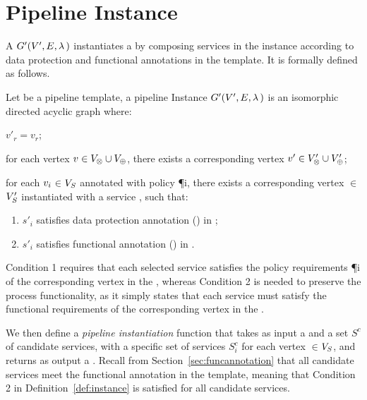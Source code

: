 \section{Pipeline Instance}\label{sec:instance}
A \pipelineInstance $G'(V',E,\lambda\,)$ instantiates a \pipelineTemplate \tChartFunction by composing services in the instance according to data protection and functional annotations in the template.  It is formally defined as follows.

\begin{definition}\label{def:instance}
  Let \tChartFunction be a pipeline template, a pipeline Instance $G'(V',E,\lambda\,)$ is an isomorphic directed acyclic graph where:
  \begin{enumerate*}[label=\textit{\roman*})]
    \item $v'_r$$=$$v_r$;
    \item for each vertex $v_{}\in V_{\otimes}\cup V_{\oplus}$, there exists a corresponding vertex $v'_{}\in V'_{\otimes}\cup V'_{\oplus}$;
    \item for each $v_{i}$$\in$$V_S$ annotated with policy \P{i}, there exists a corresponding vertex $\in$$V'_S$ instantiated with a service , such that:
  \end{enumerate*}
  \begin{enumerate}[label=\arabic*)]
    \item $s'_i$ satisfies data protection annotation \myLambda() in \tChartFunction;
    \item $s'_i$ satisfies functional annotation \myGamma() in \tChartFunction.
  \end{enumerate}
\end{definition}

Condition 1 requires that each selected service  satisfies the policy requirements \P{i} of the corresponding vertex  in the \pipelineTemplate, whereas Condition 2 is needed to preserve the process functionality, as it simply states that each service  must satisfy the functional requirements  of the corresponding vertex  in the \pipelineTemplate.

We then define a \emph{pipeline instantiation} function that takes as input a \pipelineTemplate \tChartFunction and a set $S^c$ of candidate services, with a specific set of services $S^c_{i}$ for each vertex $\in$$V_S$, and returns as output a \pipelineInstance \iChartFunction. Recall from Section~\ref{sec:funcannotation} that all candidate services meet the functional annotation in the template, meaning that Condition 2 in Definition~\ref{def:instance} is satisfied for all candidate services.


